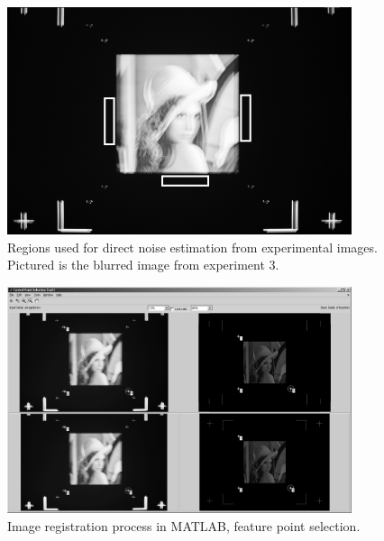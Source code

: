 \documentclass[12pt,notitlepage]{report}
\begin{document}
\begin{figure}[h]
 \centering
  \includegraphics[width=0.9\textwidth]{noise_estimation_regions.png}
 \caption[Regions used for direct noise estimation from experimental images]{Regions used for direct noise estimation from experimental images. Pictured is the blurred image from experiment 3.}
 \label{fig:noise_estimation_regions}
\end{figure}


\begin{figure}[h]
 \centering
  \includegraphics[width=0.9\textwidth]{registration_process.png}
 \caption[Image registration process in MATLAB, feature point selection]{Image registration process in MATLAB, feature point selection.}
 \label{fig:registration_process}
\end{figure}
\end{document}
